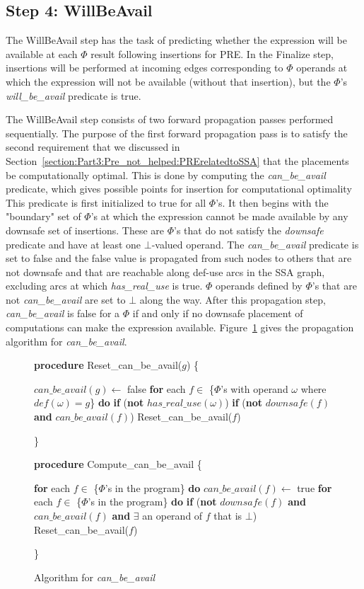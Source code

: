 \subsection{Step 4: WillBeAvail}

The WillBeAvail step has the task of predicting whether the expression
will be available at each $\Phi$ result following insertions for PRE.
In the Finalize step, insertions will be performed at incoming edges
corresponding to $\Phi$ operands at which the expression will not be
available (without that insertion), but the $\Phi$'s \emph{will\_be\_avail} 
predicate is true.

The WillBeAvail step consists of two forward propagation passes performed
sequentially.  The purpose of the first forward propagation pass is to 
satisfy the second requirement that we discussed in 
Section~\ref{section:Part3:Pre_not_helped:PRErelatedtoSSA}
that the placements be computationally optimal.   This is done by computing
the \emph{can\_be\_avail} predicate, which gives possible points for
insertion for computational optimality  This predicate is first initialized
to true for all $\Phi$'s.  It then begins with the "boundary" set of $\Phi$'s
at which the expression cannot be made available by any downsafe set of
insertions.  These are $\Phi$'s that do not satisfy the \emph{downsafe}
predicate and have at least one $\bot$-valued operand.  The 
\emph{can\_be\_avail} predicate is set to false and the false value is
propagated from such nodes to others that are not downsafe and that are
reachable along def-use arcs in the SSA graph, excluding arcs at which
\emph{has\_real\_use} is true.  $\Phi$ operands defined by $\Phi$'s that
are not \emph{can\_be\_avail} are set to $\bot$ along the way.  After this
propagation step, \emph{can\_be\_avail} is false for a $\Phi$ if and only if
no downsafe placement of computations can make the expression available.
Figure~\ref{fig: canbeavail} gives the propagation algorithm for
\emph{can\_be\_avail}.

\begin{figure}[!ht]
{\bf procedure} Reset\_can\_be\_avail($g$) 
\{
\begin{code}
 $can\_be\_avail(g) \leftarrow$ false
 {\bf for} each $f \in$ \{$\Phi$'s with operand $\omega$ where $def(\omega) = g$\} {\bf do}
   {\bf if} ({\bf not} $has\_real\_use(\omega)$)
     {\bf if} ({\bf not} $downsafe(f)$ {\bf and} $can\_be\_avail(f)$)
       Reset\_can\_be\_avail($f$)
\end{code}
\}

{\bf procedure} Compute\_can\_be\_avail
\{
\begin{code}
 {\bf for} each $f \in$ \{$\Phi$'s in the program\} {\bf do}
   $can\_be\_avail(f) \leftarrow$ true
 {\bf for} each $f \in$ \{$\Phi$'s in the program\} {\bf do}
   {\bf if} ({\bf not} $downsafe(f)$ {\bf and}
       $can\_be\_avail(f)$ {\bf and}
       $\exists$ an operand of $f$ that is $\bot$)
	Reset\_can\_be\_avail($f$)
\end{code}
\}
\caption{Algorithm for \emph{can\_be\_avail}}
\label{fig: canbeavail}
\end{figure}

